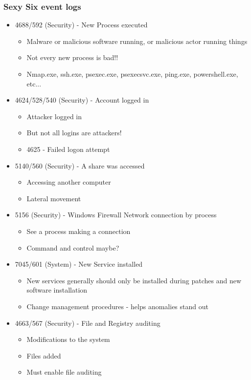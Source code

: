 \subsubsection*{Sexy Six event logs}
\begin{itemize}
  \item 4688/592 (Security) - New Process executed
  \begin{itemize}
    \item Malware or malicious software running, or malicious actor running things
    \item Not every new process is bad!!
    \item Nmap.exe, ssh.exe, psexec.exe, psexecsvc.exe, ping.exe, powershell.exe, etc...
  \end{itemize}
  \item 4624/528/540 (Security) - Account logged in
  \begin{itemize}
    \item Attacker logged in
    \item But not all logins are attackers!
    \item 4625 - Failed logon attempt
  \end{itemize}
  \item 5140/560 (Security) - A share was accessed
  \begin{itemize}
    \item Accessing another computer
    \item Lateral movement
  \end{itemize}

  \item 5156 (Security) - Windows Firewall Network connection by process
  \begin{itemize}
    \item See a process making a connection
    \item Command and control maybe?
  \end{itemize}
  \item 7045/601 (System) - New Service installed
  \begin{itemize}
    \item New services generally should only be installed during patches and new software installation
    \item Change management procedures - helps anomalies stand out
  \end{itemize}
  \item 4663/567 (Security) - File and Registry auditing
  \begin{itemize}
    \item Modifications to the system
    \item Files added
    \item Must enable file auditing
  \end{itemize}


\end{itemize}
